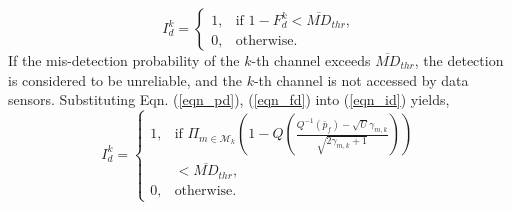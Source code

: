 \documentclass[journal]{IEEEtran} \ifCLASSINFOpdf
\begin{document}
\begin{equation}
\label{eqn_id}
I_d^k= \left\{
\begin{array}{rl}
1, & \text{if }  1 - F_d^k < \overline{MD}_{thr},\\
0, & \text{otherwise}.
\end{array} \right.
\end{equation}
If the mis-detection probability of the $k$-th channel exceeds  $\overline{MD}_{thr}$, the detection is considered to be unreliable, and the $k$-th channel is not accessed by data sensors. Substituting Eqn. (\ref{eqn_pd}), (\ref{eqn_fd}) into (\ref{eqn_id}) yields,
\begin{equation} \label{eqn_ind2}
I_d^k= \left\{
\begin{array}{rl}
1, & \text{if }   \Pi_{m \in \mathcal{M}_k} \left( 1- Q\left(\frac{Q^{-1}(\bar{p}_f) - \sqrt{U}\gamma_{m,k}}{\sqrt{2 \gamma_{m,k} + 1}} \right) \right)  \\
 &< \overline{MD}_{thr},\\ 0,& \text{otherwise}.
\end{array} \right.
\end{equation}
\end{document}

